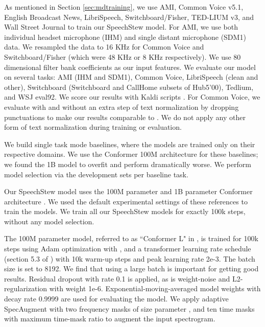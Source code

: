 \documentclass[a4paper]{article}
\begin{document}
As mentioned in Section \ref{sec:mdtraining}, we use AMI, Common Voice v5.1, English Broadcast News, LibriSpeech, Switchboard/Fisher, TED-LIUM v3, and Wall Street Journal to train our SpeechStew model. For AMI, we use both individual headset microphone (IHM) and single distant microphone (SDM1) data. We resampled the data to 16 KHz for Common Voice and Switchboard/Fisher (which were 48 KHz or 8 KHz respectively). We use 80 dimensional filter bank coefficients as our input features. We evaluate our model on several tasks: AMI (IHM and SDM1), Common Voice, LibriSpeech (clean and other), Switchboard (Switchboard and CallHome subsets of Hub5'00), Tedlium, and WSJ eval92. We score our results with Kaldi scripts \cite{povey-asru-2011}. For Common Voice, we evaluate with and without an extra step of text normalization by dropping punctuations to make our results comparable to \cite{likhomanenko-arxiv-2020}. We do not apply any other form of text normalization during training or evaluation.

We build single task mode baselines, where the models are trained only on their respective domains. We use the Conformer 100M architecture \cite{gulati-interspeech-2020} for these baselines; we found the 1B model to overfit and perform dramatically worse. We perform model selection via the development sets per baseline task.

Our SpeechStew model uses the 100M parameter and 1B parameter Conformer architecture \cite{gulati-interspeech-2020,zhang-arxiv-2020}. We used the default experimental settings of these references to train the models. We train all our SpeechStew models for exactly 100k steps, without any model selection.

The 100M parameter model, referred to as ``Conformer L" in \cite{gulati-interspeech-2020}, is trained for 100k steps using Adam optimization with ,  and a transformer learning rate schedule (section 5.3 of \cite{vaswani-nips-2017}) with 10k warm-up steps and peak learning rate 2e-3. The batch size is set to 8192. We find that using a large batch is important for getting good results. Residual dropout with rate 0.1 is applied, as is weight-noise \cite{graves-nips-2011} and L2-regularization with weight 1e-6. Exponential-moving-averaged model weights with decay rate 0.9999 are used for evaluating the model. We apply adaptive SpecAugment \cite{park-interspeech-2019,park-icassp-2020} with two frequency masks of size parameter , and ten time masks with maximum time-mask ratio  to augment the input spectrogram.
\end{document}
